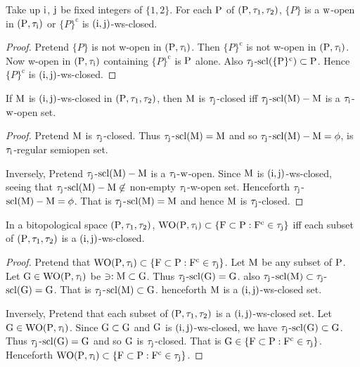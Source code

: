 \begin{thm}\label{thm8.2.12}
Take up $\mathrm{i}$, $\mathrm{j}$ be fixed integers of $\{1, 2\}$. For each $\mathrm{P}$ of $(\mathrm{P}, \tau_1, \tau_2 )$, $\{P\}$ is a $\mathrm{w}$-open in $(\mathrm{P}, \tau_{\mathrm{i}} )$ or $\{P\}^{\text{c}}$ is $(\mathrm{i}, \mathrm{j})$-ws-closed.
\end{thm}

\begin{proof}
Pretend $\{P\}$ is not w-open in $(\mathrm{P}, \tau_{\mathrm{i}} )$. Then $\{P\}^{\text{c}}$ is not w-open in $(\mathrm{P}, \tau_{\mathrm{i}} )$. Now w-open in $(\mathrm{P}, \tau_{\mathrm{i}} )$ containing $\{P\}^{\text{c}}$ is $\mathrm{P}$ alone. Also $\tau_{\mathrm{j}}$-$\mathrm{scl}(\{\mathrm{P}\}^{\text{c}}) \subset \mathrm{P}$. Hence $\{P\}^{\text{c}}$ is $(\mathrm{i}, \mathrm{j})$-ws-closed.
\end{proof}

\begin{coro}\label{coro8.2.1}
If $\mathrm{M}$ is $(\mathrm{i}, \mathrm{j})$-ws-closed in $(\mathrm{P}, \tau_1, \tau_2 )$, then $\mathrm{M}$ is $\tau_{\mathrm{j}}$-closed iff $\tau_{\mathrm{j}}$-$\mathrm{scl}(\mathrm{M})-\mathrm{M}$ is a $\tau_{\mathrm{i}}$-$\mathrm{w}$-open set.
\end{coro}

\begin{proof}
Pretend $\mathrm{M}$ is $\tau_{\mathrm{j}}$-closed. Thus $\tau_{\mathrm{j}}$-$\mathrm{scl}(\mathrm{M}) = \mathrm{M}$ and so $\tau_{\mathrm{j}}$-$\mathrm{scl}(\mathrm{M})-\mathrm{M}=\phi$, is $\tau_{\mathrm{i}}$-regular semiopen set.

Inversely, Pretend $\tau_{\mathrm{j}}$-$\mathrm{scl}(\mathrm{M})-\mathrm{M}$ is a $\tau_{\mathrm{i}}$-$\mathrm{w}$-open. Since $\mathrm{M}$ is $(\mathrm{i}, \mathrm{j})$-ws-closed, seeing that $\tau_{\mathrm{j}}$-$\mathrm{scl}(\mathrm{M})-\mathrm{M}\not\in$ non-empty $\tau_{\mathrm{i}}$-w-open set. Henceforth $\tau_{\mathrm{j}}$-$\mathrm{scl}(\mathrm{M})-\mathrm{M}=\phi$. That is $\tau_{\mathrm{j}}$-$\mathrm{scl}(\mathrm{M})=\mathrm{M}$ and hence $\mathrm{M}$ is $\tau_{\mathrm{j}}$-closed.
\end{proof}

\begin{thm}\label{thm8.2.13}
In a bitopological space $(\mathrm{P}, \tau_1, \tau_2 )$, $\mathrm{WO}(\mathrm{P}, \tau_{\mathrm{i}} ) \subset \{\mathrm{F}\subset\mathrm{P}: \mathrm{F}^{\text{c}} \in\tau_{\mathrm{j}}\}$ iff each subset of $(\mathrm{P}, \tau_1, \tau_2 )$ is a $(\mathrm{i}, \mathrm{j})$-ws-closed.
\end{thm}

\begin{proof}
Pretend that $\mathrm{WO}(\mathrm{P}, \tau_{\mathrm{i}} ) \subset \{\mathrm{F}\subset \mathrm{P}: \mathrm{F}^{\text{c}} \in\tau_{\mathrm{j}} \}$. Let $\mathrm{M}$ be any subset of $\mathrm{P}$. Let $\mathrm{G}\in \mathrm{WO}(\mathrm{P}, \tau_{\mathrm{i}} )$ be $\ni: \mathrm{M} \subset \mathrm{G}$. Thus $\tau_{\mathrm{j}}$-$\mathrm{scl}(\mathrm{G})=\mathrm{G}$. also $\tau_{\mathrm{j}}$-$\mathrm{scl}(\mathrm{M}) \subset \tau_{\mathrm{j}}$-$\mathrm{scl}(\mathrm{G})=\mathrm{G}$. That is $\tau_{\mathrm{j}}$-$\mathrm{scl}(\mathrm{M}) \subset \mathrm{G}$. henceforth $\mathrm{M}$ is a $(\mathrm{i}, \mathrm{j})$-ws-closed set.

Inversely, Pretend that each subset of $(\mathrm{P}, \tau_1, \tau_2 )$ is a $(\mathrm{i}, \mathrm{j})$-ws-closed set. Let $\mathrm{G}\in \mathrm{WO}(\mathrm{P},\tau_{\mathrm{i}} )$. Since $\mathrm{G} \subset \mathrm{G}$ and $\mathrm{G}$ is $(\mathrm{i}, \mathrm{j})$-ws-closed, we have $\tau_{\mathrm{j}}$-$\mathrm{scl}(\mathrm{G}) \subset \mathrm{G}$. Thus $\tau_{\mathrm{j}}$-$\mathrm{scl}(\mathrm{G}) =\mathrm{G}$ and so $\mathrm{G}$ is $\tau_{\mathrm{j}}$-closed. That is $\mathrm{G}\in\{\mathrm{F}\subset \mathrm{P}: \mathrm{F}^{\text{c}} \in\tau_{\mathrm{j}} \}$. Henceforth $\mathrm{WO}(\mathrm{P}, \tau_{\mathrm{i}} ) \subset \{\mathrm{F}\subset \mathrm{P}: \mathrm{F}^{\text{c}} \in\tau_{\mathrm{j}} \}$. 
\end{proof}

